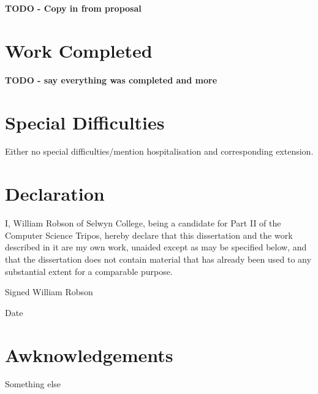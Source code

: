 \textbf{TODO - Copy in from proposal}

\section*{Work Completed}

\textbf{TODO - say everything was completed and more}

\section*{Special Difficulties}

Either no special difficulties/mention hospitalisation and corresponding extension.

\pagebreak

\section*{Declaration}

I, William Robson of Selwyn College, being a candidate for Part II of the Computer Science Tripos,
hereby declare that this dissertation and the work described in it are my own work, unaided except
as may be specified below, and that the dissertation does not contain material that has already
been used to any substantial extent for a comparable purpose.

Signed William Robson

Date \thedate

\cleardoublepage

\tableofcontents
\listoffigures

\newpage

\section*{Awknowledgements}

Something else

\cleardoublepage
\setcounter{page}{1}
\pagestyle{headings}